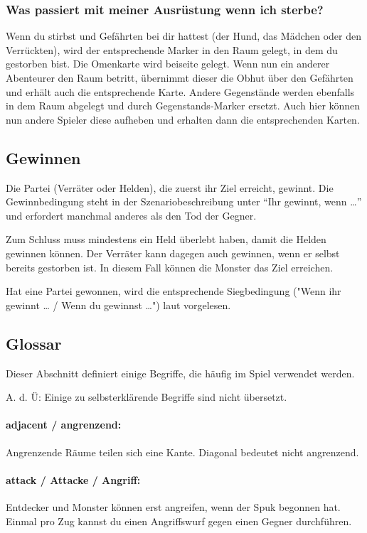 \subsubsection{Was passiert mit meiner Ausrüstung wenn ich sterbe?}

Wenn du stirbst und Gefährten bei dir hattest (der Hund, das Mädchen oder den Verrückten), wird der entsprechende Marker in den Raum gelegt, in dem du gestorben bist. Die Omenkarte wird beiseite gelegt. Wenn nun ein anderer Abenteurer den Raum betritt, übernimmt dieser die Obhut über den Gefährten und erhält auch die entsprechende Karte. Andere Gegenstände werden ebenfalls in dem Raum abgelegt und durch Gegenstands-Marker ersetzt. Auch hier können nun andere Spieler diese aufheben und erhalten dann die entsprechenden Karten.

\subsection{Gewinnen}

Die Partei (Verräter oder Helden), die zuerst ihr Ziel erreicht, gewinnt. Die Gewinnbedingung steht in der Szenariobeschreibung unter ``Ihr gewinnt, wenn …'' und erfordert manchmal anderes als den Tod der Gegner.

Zum Schluss muss mindestens ein Held überlebt haben, damit die Helden gewinnen können. Der Verräter kann dagegen auch gewinnen, wenn er selbst bereits gestorben ist. In diesem Fall können die Monster das Ziel erreichen.

Hat eine Partei gewonnen, wird die entsprechende Siegbedingung ("Wenn ihr gewinnt … / Wenn du gewinnst …") laut vorgelesen.

\subsection{Glossar}

Dieser Abschnitt definiert einige Begriffe, die häufig im Spiel verwendet werden.

A. d. Ü: Einige zu selbsterklärende Begriffe sind nicht übersetzt.

\paragraph{adjacent / angrenzend:} Angrenzende Räume teilen sich eine Kante. Diagonal bedeutet nicht angrenzend.

\paragraph{attack / Attacke / Angriff:} Entdecker und Monster können erst angreifen, wenn der Spuk begonnen hat. Einmal pro Zug kannst du einen Angriffswurf gegen einen Gegner durchführen.

